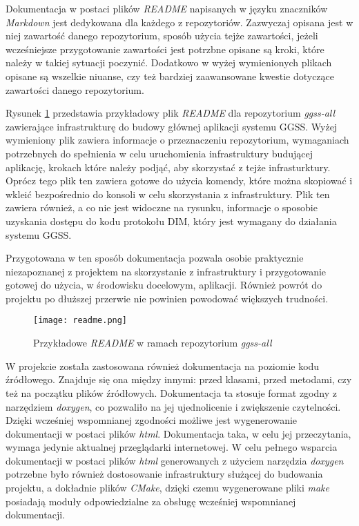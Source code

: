 Dokumentacja w postaci plików \emph{README} napisanych w języku znaczników \emph{Markdown} jest dedykowana dla każdego z repozytoriów. Zazwyczaj opisana jest w niej zawartość danego repozytorium, sposób użycia tejże zawartości, jeżeli wcześniejsze przygotowanie zawartości jest potrzbne opisane są kroki, które należy w takiej sytuacji poczynić. Dodatkowo w wyżej wymienionych plikach opisane są wszelkie niuanse, czy też bardziej zaawansowane kwestie dotyczące zawartości danego repozytorium.

Rysunek \ref{fig:readme} przedstawia przykładowy plik \emph{README} dla repozytorium \emph{ggss-all} zawierające infrastrukturę do budowy głównej aplikacji systemu GGSS. Wyżej wymieniony plik zawiera informacje o przeznaczeniu repozytorium, wymaganiach potrzebnych do spełnienia w celu uruchomienia infrastruktury budującej aplikację, krokach które należy podjąć, aby skorzystać z tejże infrasturktury. Oprócz tego plik ten zawiera gotowe do użycia komendy, które można skopiować i wkleić bezpośrednio do konsoli w celu skorzystania z infrastruktury. Plik ten zawiera również, a co nie jest widoczne na rysunku, informacje o sposobie uzyskania dostępu do kodu protokołu DIM, który jest wymagany do działania systemu GGSS.


Przygotowana w ten sposób dokumentacja pozwala osobie praktycznie niezapoznanej z projektem na skorzystanie z infrastruktury i przygotowanie gotowej do użycia, w środowisku docelowym, aplikacji. Również powrót do projektu po dłuższej przerwie nie powinien powodować większych trudności.
\newpage
\begin{figure}[H]
    \centering
    \texttt{[image: readme.png]}
    \caption{Przykładowe \emph{README} w ramach repozytorium \emph{ggss-all}}
    \label{fig:readme}
\end{figure} %

W projekcie została zastosowana również dokumentacja na poziomie kodu źródłowego. Znajduje się ona między innymi: przed klasami, przed metodami, czy też na początku plików źródłowych. Dokumentacja ta stosuje format zgodny z narzędziem \emph{doxygen}, co pozwaliło na jej ujednolicenie i zwiększenie czytelności. Dzięki wcześniej wspomnianej zgodności możliwe jest wygenerowanie dokumentacji w postaci plików \emph{html}. Dokumentacja taka, w celu jej przeczytania, wymaga jedynie aktualnej przeglądarki internetowej. W celu pełnego wsparcia dokumentacji w postaci plików \emph{html} generowanych z użyciem narzędzia \emph{doxygen} potrzebne było również dostosowanie infrastruktury służącej do budowania projektu, a dokładnie plików \emph{CMake}, dzięki czemu wygenerowane pliki \emph{make} posiadają moduły odpowiedzialne za obsługę wcześniej wspomnianej dokumentacji.

